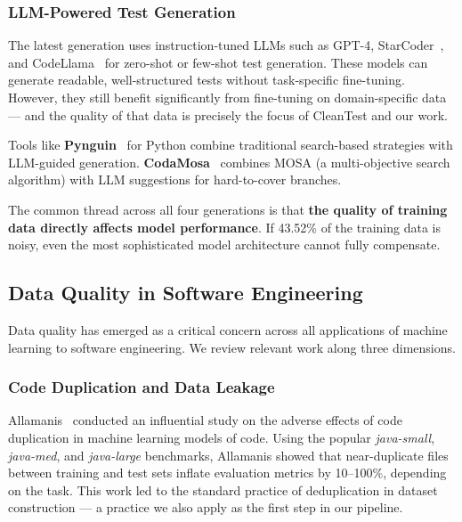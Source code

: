 \documentclass[acmlarge,nonacm,screen]{acmart}
\begin{document}
\subsubsection{LLM-Powered Test Generation}

The latest generation uses instruction-tuned LLMs such as GPT-4, StarCoder~\cite{li2023starcoder}, and CodeLlama~\cite{roziere2023code} for zero-shot or few-shot test generation. These models can generate readable, well-structured tests without task-specific fine-tuning. However, they still benefit significantly from fine-tuning on domain-specific data --- and the quality of that data is precisely the focus of CleanTest and our work.

Tools like \textbf{Pynguin}~\cite{lukasczyk2022pynguin} for Python combine traditional search-based strategies with LLM-guided generation. \textbf{CodaMosa}~\cite{lemieux2023codamosa} combines MOSA (a multi-objective search algorithm) with LLM suggestions for hard-to-cover branches.

The common thread across all four generations is that \textbf{the quality of training data directly affects model performance}. If 43.52\% of the training data is noisy, even the most sophisticated model architecture cannot fully compensate.

\subsection{Data Quality in Software Engineering}

Data quality has emerged as a critical concern across all applications of machine learning to software engineering. We review relevant work along three dimensions.

\subsubsection{Code Duplication and Data Leakage}

Allamanis~\cite{allamanis2019adverse} conducted an influential study on the adverse effects of code duplication in machine learning models of code. Using the popular \textit{java-small}, \textit{java-med}, and \textit{java-large} benchmarks, Allamanis showed that near-duplicate files between training and test sets inflate evaluation metrics by 10--100\%, depending on the task. This work led to the standard practice of deduplication in dataset construction --- a practice we also apply as the first step in our pipeline.
\end{document}
